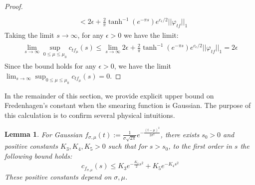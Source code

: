 \documentclass[a4paper,11pt]{article}
\newtheorem{lemma}[theorem]{Lemma}
\theoremstyle{definition}
\begin{document}
\begin{proof}
\begin{align}
\begin{split}
            \\&
            < 2\epsilon + \frac{2}{\pi}\tanh^{-1}(e^{-\pi s})e^{c_\epsilon / 2}||\varphi_{tf}||_1
        \end{split}    
    \end{align}
    Taking the limit $s\rightarrow\infty$, for any $\epsilon > 0$ we have the limit:
    \begin{align}
        \begin{split}
            \lim_{s\rightarrow\infty}\sup_{0\leq \mu\leq \mu_0}c_{tf_\mu}(s) \leq \lim_{s\rightarrow\infty}2\epsilon + \frac{2}{\pi}\tanh^{-1}(e^{-\pi s})e^{c_\epsilon / 2}||\varphi_{tf}||_1 = 2\epsilon
        \end{split}
    \end{align}
    Since the bound holds for any $\epsilon > 0$, we have the limit $\lim_{s\rightarrow\infty}\sup_{0\leq \mu\leq \mu_0}c_{tf_\mu}(s) = 0$.
\end{proof}
In the remainder of this section, we provide explicit upper bound on Fredenhagen's constant when the smearing function is Gaussian. The purpose of this calculation is to confirm several physical intuitions.
\begin{lemma}
    For Gaussian $f_{\sigma,\mu}(t) := \frac{1}{\sigma\sqrt{2\pi}}e^{-\frac{(t - \mu)^2}{2\sigma^2}}$, there exists $s_0 > 0$ and positive constants $K_3, K_4, K_5 > 0$ such that for $s > s_0$, to the first order in $s$ the following bound holds:
    \begin{equation}
        c_{f_{\sigma,\mu}}(s) \leq K_3e^{-\frac{K_4}{2}s^2} + K_5e^{-K_4 s^2}
    \end{equation}
    These positive constants depend on $\sigma,\mu$.
\end{lemma}
\end{document}
